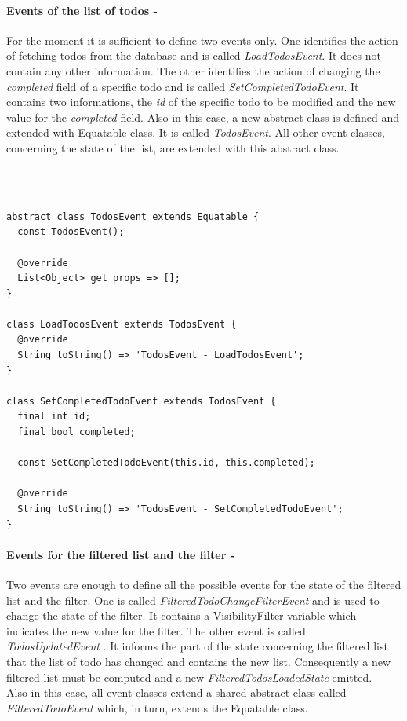\paragraph{Events of the list of todos - }
\label{subpar:todo_app_bloc_core_state}

For the moment it is sufficient to define two events only. One identifies the action of fetching todos from the database and is called \textit{LoadTodosEvent}. It does not contain any other information. The other identifies the action of changing the \textit{completed} field of a specific todo and is called \textit{SetCompletedTodoEvent}. It contains two informations, the \textit{id} of the specific todo to be modified and the new value for the \textit{completed }field. 
Also in this case, a new abstract class is defined and extended with Equatable class. It is called \textit{TodosEvent}. All other event classes,  concerning the state of the list, are extended with this abstract class.
\begin{code}
\mbox{}\\
 \mbox{}
\label{code:2.14}
\begin{verbatim}

abstract class TodosEvent extends Equatable {
  const TodosEvent();

  @override
  List<Object> get props => [];
}

class LoadTodosEvent extends TodosEvent {
  @override
  String toString() => 'TodosEvent - LoadTodosEvent';
}

class SetCompletedTodoEvent extends TodosEvent {
  final int id;
  final bool completed;

  const SetCompletedTodoEvent(this.id, this.completed);

  @override
  String toString() => 'TodosEvent - SetCompletedTodoEvent';
}
\end{verbatim}
\mbox{}
\end{code}

\paragraph{Events for the filtered list and the filter - }
\label{subpar:todo_app_bloc_core_state}

Two events are enough to define all the possible events for the state of the filtered list and the filter. One is called \textit{FilteredTodoChangeFilterEvent} and is used to change the state of the filter. It contains a VisibilityFilter variable which indicates the new value for the filter. The other event is called \textit{TodosUpdatedEvent} . It informs the part of the state concerning the filtered list that the list of todo has changed and contains the new list. Consequently a new filtered list must be computed and a new \textit{FilteredTodosLoadedState} emitted.\\
Also in this case, all event classes extend a shared abstract class called \textit{FilteredTodoEvent} which,  in turn, extends the Equatable class. 

